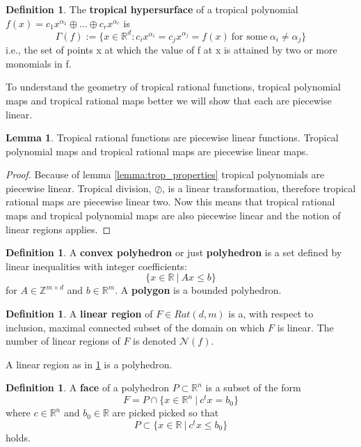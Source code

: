 \documentclass{article}
\theoremstyle{definition}
\newtheorem{lemma}[theorem]{Lemma}
\newtheorem{definition}[theorem]{Definition}
\begin{document}
\begin{definition}\cite[p.~3]{zhang2018tropical}
The \textbf{tropical hypersurface} of a tropical polynomial $f(x) = c_1 x^{\alpha_1} \oplus \dots \oplus c_r x^{\alpha_r}$ is 
$$\Gamma(f) := \{ x \in \mathbb{R}^{d} : c_i x^{\alpha_i} = c_j x^{\alpha_j} = f(x) \ \text{for some} \ \alpha_i \neq \alpha_j \}$$
i.e., the set of points x at which the value of f at x is attained by two or more monomials in f.
\end{definition}

To understand the geometry of tropical rational functions, tropical polynomial maps and tropical rational maps better we will show that each are piecewise linear.


\begin{lemma}
Tropical rational functions are piecewise linear functions. Tropical polynomial maps and tropical rational maps are piecewise linear maps.
\end{lemma}
\begin{proof}
Because of lemma \ref{lemma:trop_properties} tropical polynomials are piecewise linear. Tropical division, $\oslash$, is a linear transformation, therefore tropical rational maps are piecewise linear two. Now this means that tropical rational maps and tropical polynomial maps are also piecewise linear and the notion of linear regions applies.
\end{proof}

\begin{definition}\cite[p.~4]{zhang2018tropical}
A \textbf{convex polyhedron} or just \textbf{polyhedron} is a set defined by linear inequalities with integer coefficients:
$$\{x \in \mathbb{R} \ | \ Ax \leq b \}$$
for $A \in \mathbb{Z}^{m \times d}$ and $b \in \mathbb{R}^{m}$. A \textbf{polygon} is a bounded polyhedron.
\end{definition}

\begin{definition}\cite[p.~4]{zhang2018tropical}
\label{def:lin_reg_of}
A \textbf{linear region} of $F \in Rat(d, m)$ is a, with respect to inclusion, maximal connected subset of the domain on which $F$ is linear. The number of linear regions of $F$ is denoted $\mathcal{N}(f)$.
\end{definition}
A linear region as in \ref{def:lin_reg_of} is a polyhedron.
\begin{definition}
A \textbf{face} of a polyhedron $P \subset \mathbb{R}^{n}$ is a subset of the form
$$F= P \cap \{x \in \mathbb{R}^{n} \ | \ c^{t}x = b_0 \}$$
where $c \in \mathbb{R}^{n}$ and $b_0 \in \mathbb{R}$ are picked picked so that
$$P \subset \{ x \in \mathbb{R} \ | \ c^{t}x \leq b_0 \}$$
holds.
\end{definition}
\end{document}
